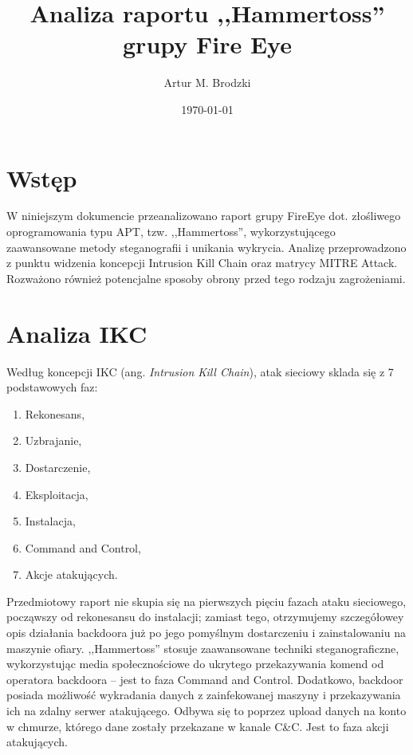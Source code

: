 \documentclass{eiti-raport}
\begin{document}
\author{Artur M. Brodzki}
\date{\today}
\subject{BCYB 2019L}
\title{Analiza raportu ,,Hammertoss'' \\ grupy Fire Eye}

\maketitle


\begin{multicols*}{2}

\section{Wstęp} \label{sec:intro}
W niniejszym dokumencie przeanalizowano raport grupy FireEye dot. złośliwego oprogramowania typu APT, tzw. ,,Hammertoss'', wykorzystującego zaawansowane metody steganografii i unikania wykrycia. Analizę przeprowadzono z punktu widzenia koncepcji Intrusion Kill Chain oraz matrycy MITRE Attack. Rozważono również potencjalne sposoby obrony przed tego rodzaju zagrożeniami. 

\section{Analiza IKC} \label{sec:2}
Według koncepcji IKC (ang. \textit{Intrusion Kill Chain}), atak sieciowy sklada się z 7 podstawowych faz:
\begin{enumerate}
	\itemsep0em
	\item Rekonesans,
	\item Uzbrajanie,
	\item Dostarczenie,
	\item Eksploitacja,
	\item Instalacja,
	\item Command and Control,
	\item Akcje atakujących.
\end{enumerate}
Przedmiotowy raport nie skupia się na pierwszych pięciu fazach ataku sieciowego, począwszy od rekonesansu do instalacji; zamiast tego, otrzymujemy szczegółowey opis działania backdoora już po jego pomyślnym dostarczeniu i zainstalowaniu na maszynie ofiary. ,,Hammertoss'' stosuje zaawansowane techniki steganograficzne, wykorzystując media społecznościowe do ukrytego przekazywania komend od operatora backdoora -- jest to faza Command and Control. Dodatkowo, backdoor posiada możliwość wykradania danych z zainfekowanej maszyny i przekazywania ich na zdalny serwer atakującego. Odbywa się to poprzez upload danych na konto w chmurze, którego dane zostały przekazane w kanale C\&C. Jest to faza akcji atakujących. 


\end{multicols*}
\end{document}
